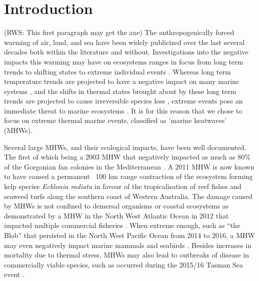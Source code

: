 \documentclass[a4paper,10pt,review]{elsarticle}
\begin{document}
\section{Introduction}
(RWS: This first paragraph may get the axe)
The anthropogenically forced warming of air, land, and sea have been widely publicized over the last several decades both within the literature \citep[e.g.][]{Manabe1967, Sawyer1972, Hansen1981, Cox2000, Rosenzweig2008} and without. Investigations into the negative impacts this warming may have on ecosystems ranges in focus from long term trends \citep[e.g.][]{Scavia2002, Walther2002, Burrows2011} to shifting states \citep[e.g.][]{Travis2003, Grebmeier2006, Blamey2015} to extreme individual events \citep[e.g.][]{Easterling2000, Barrett2008, Wernberg2012a}. Whereas long term temperature trends are projected to have a negative impact on many marine systems \citep{IPCC2014}, and the shifts in thermal states brought about by these long term trends are projected to cause irreversible species loss \citep{Thomas2004}, extreme events pose an immediate threat to marine ecosystems \citep[e.g.][]{Garrabou2009, Cavole2016, Wernberg2016}. It is for this reason that we chose to focus on extreme thermal marine events, classified as 'marine heatwaves' (MHWs).

Several large MHWs, and their ecological impacts, have been well documented. The first of which being a 2003 MHW that negatively impacted as much as 80\% of the Gorgonian fan colonies in the Mediterranean \citep{Garrabou2009}. A 2011 MHW is now known to have caused a permanent ~100 km range contraction of the ecosystem forming kelp species \emph{Ecklonia radiata} in favour of the tropicalisation of reef fishes and seaweed turfs \citep{Wernberg2016} along the southern coast of Western Australia. The damage caused by MHWs is not confined to demersal organisms or coastal ecosystems as demonstrated by a MHW in the North West Atlantic Ocean in 2012 that impacted multiple commercial fisheries \citep{Mills2013}. When extreme enough, such as ``the Blob'' that persisted in the North West Pacific Ocean from 2014 to 2016, a MHW may even negatively impact marine mammals and seabirds \citep{Cavole2016}. Besides increases in mortality due to thermal stress, MHWs may also lead to outbreaks of disease in commercially viable species, such as occurred during the 2015/16 Tasman Sea event \citep{Oliver2017}. 
\end{document}
